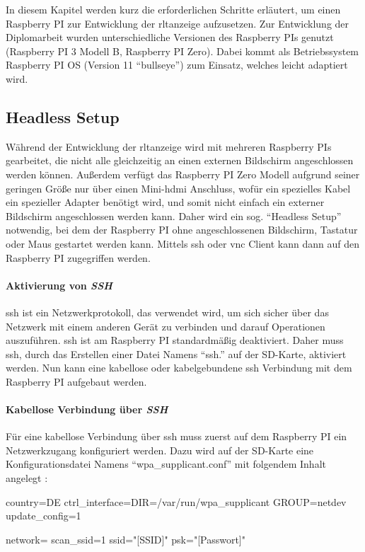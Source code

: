 \label{raspi_setup}
In diesem Kapitel werden kurz die erforderlichen Schritte erläutert, um einen Raspberry PI zur Entwicklung der \ac{rltanzeige} aufzusetzen.
Zur Entwicklung der Diplomarbeit wurden unterschiedliche Versionen des Raspberry PIs genutzt (Raspberry PI 3 Modell B, Raspberry PI Zero). Dabei kommt als Betriebssystem Raspberry PI OS (Version 11 \enquote{bullseye}) zum Einsatz, welches leicht adaptiert wird.

\subsection{Headless Setup}\label{raspi_headless_setup}
Während der Entwicklung der \ac{rltanzeige} wird mit mehreren Raspberry PIs gearbeitet, die nicht alle gleichzeitig an einen externen Bildschirm angeschlossen werden können. Außerdem verfügt das Raspberry PI Zero Modell aufgrund seiner geringen Größe nur über einen Mini-\ac{hdmi} Anschluss, wofür ein spezielles Kabel \bzw ein spezieller Adapter benötigt wird, und somit nicht einfach ein externer Bildschirm angeschlossen werden kann. Daher wird ein sog. \enquote{Headless Setup} notwendig, bei dem der Raspberry PI ohne angeschlossenen Bildschirm, Tastatur oder Maus gestartet werden kann. Mittels \ac{ssh} oder \ac{vnc} Client kann dann auf den Raspberry PI zugegriffen werden.
\cite[vgl.][]{Piltch:2022}

\paragraph{Aktivierung von \textit{SSH}}
\ac{ssh} ist ein Netzwerkprotokoll, das verwendet wird, um sich sicher über das Netzwerk mit einem anderen Gerät zu verbinden und darauf Operationen auszuführen. \ac{ssh} ist am Raspberry PI standardmäßig deaktiviert.  Daher muss \ac{ssh}, durch das Erstellen einer Datei Namens \enquote{ssh.} auf der SD-Karte, aktiviert werden. Nun kann eine kabellose oder kabelgebundene \ac{ssh} Verbindung mit dem Raspberry PI aufgebaut werden.

\paragraph{Kabellose Verbindung über \textit{SSH}}
Für eine kabellose Verbindung über \ac{ssh} muss zuerst auf dem Raspberry PI ein Netzwerkzugang konfiguriert werden. Dazu wird auf der SD-Karte eine Konfigurationsdatei Namens \enquote{wpa\_supplicant.conf} mit folgendem Inhalt angelegt \cite[vgl.][]{Piltch:2022}:
\begin{textcode}
country=DE
ctrl_interface=DIR=/var/run/wpa_supplicant GROUP=netdev
update_config=1

network={
    scan_ssid=1
    ssid="[SSID]"
    psk="[Passwort]"
}
\end{textcode}

